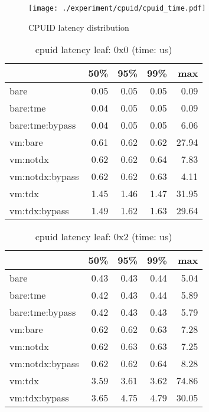 \documentclass[letterpaper,twocolumn,10pt]{article}
\begin{document}
\begin{figure*}[t]
\centering
\texttt{[image: ./experiment/cpuid/cpuid\_time.pdf]}
\caption{CPUID latency distribution}
\label{fig:cpuid-latency}
\end{figure*}

\begin{table}
\centering
\caption{cpuid latency leaf: 0x0 (time: us)}
\label{tab:cpuid_0x0}
\begin{tabular}{lrrrr}
\toprule
{} &  50\% &  95\% &  99\% &   max \\
\midrule
bare            & 0.05 & 0.05 & 0.05 &  0.09 \\
bare:tme        & 0.04 & 0.05 & 0.05 &  0.09 \\
bare:tme:bypass & 0.04 & 0.05 & 0.05 &  6.06 \\
vm:bare         & 0.61 & 0.62 & 0.62 & 27.94 \\
vm:notdx        & 0.62 & 0.62 & 0.64 &  7.83 \\
vm:notdx:bypass & 0.62 & 0.62 & 0.63 &  4.11 \\
vm:tdx          & 1.45 & 1.46 & 1.47 & 31.95 \\
vm:tdx:bypass   & 1.49 & 1.62 & 1.63 & 29.64 \\
\bottomrule
\end{tabular}
\end{table}

\begin{table}
\centering
\caption{cpuid latency leaf: 0x2 (time: us)}
\label{tab:cpuid_0x2}
\begin{tabular}{lrrrr}
\toprule
{} &  50\% &  95\% &  99\% &   max \\
\midrule
bare            & 0.43 & 0.43 & 0.44 &  5.04 \\
bare:tme        & 0.42 & 0.43 & 0.44 &  5.89 \\
bare:tme:bypass & 0.42 & 0.43 & 0.43 &  5.79 \\
vm:bare         & 0.62 & 0.62 & 0.63 &  7.28 \\
vm:notdx        & 0.62 & 0.63 & 0.63 &  7.25 \\
vm:notdx:bypass & 0.62 & 0.62 & 0.64 &  8.28 \\
vm:tdx          & 3.59 & 3.61 & 3.62 & 74.86 \\
vm:tdx:bypass   & 3.65 & 4.75 & 4.79 & 30.05 \\
\bottomrule
\end{tabular}
\end{table}
\end{document}
